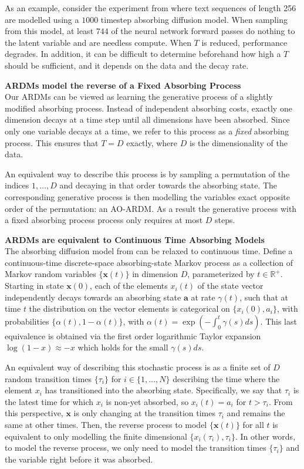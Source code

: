 \documentclass{article} \usepackage{iclr2022_conference,times}
\def\va{{\bm{a}}}
\def\vx{{\bm{x}}}
\begin{document}
As an example, consider the experiment from \citep{austin2021structured} where text sequences of length 256 are modelled using a $1000$ timestep absorbing diffusion model. When sampling from this model, at least $744$ of the neural network forward passes do nothing to the latent variable and are needless compute. When $T$ is reduced, performance degrades. In addition, it can be difficult to determine beforehand how high a $T$ should be sufficient, and it depends on the data and the decay rate. 


\textbf{ARDMs model the reverse of a Fixed Absorbing Process} \\
Our ARDMs can be viewed as learning the generative process of a slightly modified absorbing process. Instead of independent absorbing costs, exactly one dimension decays at a time step until all dimensions have been absorbed. Since only one variable decays at a time, we refer to this process as a \textit{fixed} absorbing process. This ensures that $T = D$ exactly, where $D$ is the dimensionality of the data.

An equivalent way to describe this process is by sampling a permutation of the indices $1, \ldots, D$ and decaying in that order towards the absorbing state. The corresponding generative process is then modelling the variables exact opposite order of the permutation: an AO-ARDM. As a result the generative process with a fixed absorbing process process only requires at most $D$ steps.


 
\textbf{ARDMs are equivalent to Continuous Time Absorbing Models} \\
The absorbing diffusion model from \citep{austin2021structured} can be relaxed to continuous time. Define a continuous-time discrete-space absorbing-state Markov process as a collection of Markov random variables $\{\mathbf{x}(t)\}$ in dimension $D$, parameterized by $t \in \mathbb{R}^{+}$. Starting in state $\vx(0)$, each of the elements $x_i(t)$ of the state vector independently decays towards an absorbing state $\va$ at rate $\gamma(t)$, such that at time $t$ the distribution on the vector elements is categorical on $\{x_{i}(0), a_i\}$, with probabilities $\{\alpha(t), 1-\alpha(t)\}$, with $\alpha(t) = \exp(-\int_{0}^{t} \gamma(s) ds)$. This last equivalence is obtained via the first order logarithmic Taylor expansion $\log(1-x) \approx -x$ which holds for the small $\gamma(s) ds$.


An equivalent way of describing this stochastic process is as a finite set of $D$ random transition times $\{\tau_i\}$ for $i \in \{1,\ldots,N\}$ describing the time where the element $x_i$ has transitioned into the absorbing state. Specifically, we say that $\tau_i$ is the latest time for which $x_i$ is non-yet absorbed, so $x_i(t) = a_i$ for $t > \tau_i$. From this perspective, $\vx$ is only changing at the transition times $\tau_i$ and remains the same at other times. Then, the reverse process to model $\{\vx(t)\}$ for all $t$ is equivalent to only modelling the finite dimensional $\{x_i(\tau_i), \tau_i\}$. In other words, to model the reverse process, we only need to model the transition times $\{\tau_i\}$ and the variable right before it was absorbed.
\end{document}
